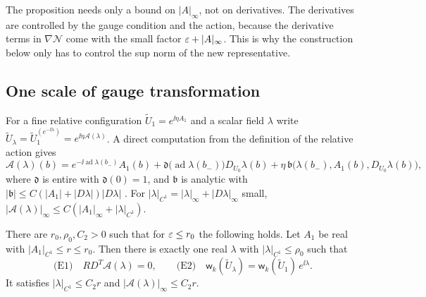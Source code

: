 The proposition needs only a bound on $|A|_\infty$, not on derivatives. The derivatives are controlled by the gauge condition and the action, because the derivative terms in $\nabla\mathcal N$ come with the small factor $\varepsilon+|A|_\infty$. This is why the construction below only has to control the sup norm of the new representative.

\subsection{One scale of gauge transformation}

For a fine relative configuration $\tilde U_1=e^{\ii\eta A_1}$ and a scalar field $\lambda$ write $\tilde U_\lambda=\tilde U_1^{(e^{-\ii\lambda})}=e^{\ii\eta\mathcal A(\lambda)}$. A direct computation from the definition of the relative action gives
\begin{equation}\label{eq:gauge-formula}
\mathcal A(\lambda)(b)=e^{-\ii\operatorname{ad}\lambda(b_-)}A_1(b)+\mathfrak d\big(\operatorname{ad}\lambda(b_-)\big)D_{U_0}\lambda(b)+\eta\,\mathfrak b\big(\lambda(b_-),A_1(b),D_{U_0}\lambda(b)\big),
\end{equation}
where $\mathfrak d$ is entire with $\mathfrak d(0)=1$, and $\mathfrak b$ is analytic with $|\mathfrak b|\le C(|A_1|+|D\lambda|)|D\lambda|$ \cite[(1.81)--(1.84)]{BalReg}. For $|\lambda|_{C^1}=|\lambda|_\infty+|D\lambda|_\infty$ small, $|\mathcal A(\lambda)|_\infty\le C(|A_1|_\infty+|\lambda|_{C^1})$.

\begin{lemma}\label{lem:one-scale}
There are $r_0,\rho_0,C_2>0$ such that for $\varepsilon\le r_0$ the following holds. Let $A_1$ be real with $|A_1|_{C^1}\le r\le r_0$. Then there is exactly one real $\lambda$ with $|\lambda|_{C^1}\le\rho_0$ such that
\[
\text{(E1)}\quad R D^T\mathcal A(\lambda)=0,\qquad\text{(E2)}\quad\mathsf w_k(\tilde U_\lambda)=\mathsf w_k(\tilde U_1)\,e^{\ii\lambda}.
\]
It satisfies $|\lambda|_{C^1}\le C_2r$ and $|\mathcal A(\lambda)|_\infty\le C_2r$.
\end{lemma}

